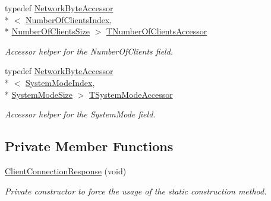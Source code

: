 \begin{DoxyCompactItemize}
typedef \hyperlink{class_terra_swarm_1_1_network_byte_accessor}{Network\-Byte\-Accessor}\\*
$<$ \hyperlink{class_terra_swarm_1_1_synchronous_1_1_client_connection_response_a4cbf4ea0e840420400a931390a8acfbdacfa0a3412da8705ea266357cfda4b3e5}{Number\-Of\-Clients\-Index}, \\*
\hyperlink{class_terra_swarm_1_1_synchronous_1_1_client_connection_response_a3933c56d09c6ccf4f1b533024d9d4b08ad751beae96e2b6b6d55e322c762772c1}{Number\-Of\-Clients\-Size} $>$ \hyperlink{class_terra_swarm_1_1_synchronous_1_1_client_connection_response_ac029cc8910297215aa037106589ec9c2}{T\-Number\-Of\-Clients\-Accessor}
\begin{DoxyCompactList}\small\item\em Accessor helper for the Number\-Of\-Clients field. \end{DoxyCompactList}\item 
typedef \hyperlink{class_terra_swarm_1_1_network_byte_accessor}{Network\-Byte\-Accessor}\\*
$<$ \hyperlink{class_terra_swarm_1_1_synchronous_1_1_client_connection_response_a4cbf4ea0e840420400a931390a8acfbda0554d9a00a3e896e87549ad13eafa1ed}{System\-Mode\-Index}, \\*
\hyperlink{class_terra_swarm_1_1_synchronous_1_1_client_connection_response_a3933c56d09c6ccf4f1b533024d9d4b08a967e285d0517d9d1920b562699ed8080}{System\-Mode\-Size} $>$ \hyperlink{class_terra_swarm_1_1_synchronous_1_1_client_connection_response_a241ee2024d2b124e89185884213650c2}{T\-System\-Mode\-Accessor}
\begin{DoxyCompactList}\small\item\em Accessor helper for the System\-Mode field. \end{DoxyCompactList}\end{DoxyCompactItemize}
\subsection*{Private Member Functions}
\begin{DoxyCompactItemize}
\item 
\hyperlink{class_terra_swarm_1_1_synchronous_1_1_client_connection_response_a478ac409364847fc12eada42064b79e3}{Client\-Connection\-Response} (void)
\begin{DoxyCompactList}\small\item\em Private constructor to force the usage of the static construction method. \end{DoxyCompactList}\end{DoxyCompactItemize}


